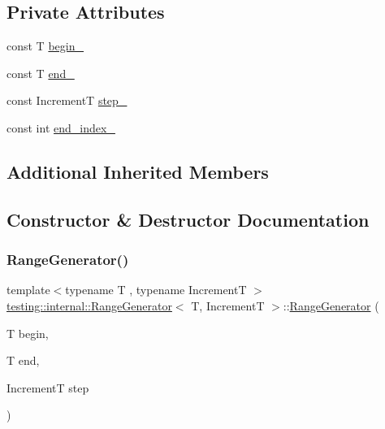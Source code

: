 \subsection*{Private Attributes}
\begin{DoxyCompactItemize}
\item 
const T \hyperlink{classtesting_1_1internal_1_1RangeGenerator_af16307fd21766bcbb973d8b3335f1a3f}{begin\+\_\+}
\item 
const T \hyperlink{classtesting_1_1internal_1_1RangeGenerator_ac36eecbaf80b51a59d59a4a4fdf5b5db}{end\+\_\+}
\item 
const IncrementT \hyperlink{classtesting_1_1internal_1_1RangeGenerator_ae7f3c4b76d8610f030fdd12285ebd8fb}{step\+\_\+}
\item 
const int \hyperlink{classtesting_1_1internal_1_1RangeGenerator_a336878a1871133e49665df60ea944076}{end\+\_\+index\+\_\+}
\end{DoxyCompactItemize}
\subsection*{Additional Inherited Members}


\subsection{Constructor \& Destructor Documentation}
\mbox{\label{classtesting_1_1internal_1_1RangeGenerator_a5b3b83223b9cada3569bcee729e0fdf3}} 
\subsubsection{\texorpdfstring{Range\+Generator()}{RangeGenerator()}}
{\footnotesize\ttfamily template$<$typename T , typename IncrementT $>$ \\
\hyperlink{classtesting_1_1internal_1_1RangeGenerator}{testing\+::internal\+::\+Range\+Generator}$<$ T, IncrementT $>$\+::\hyperlink{classtesting_1_1internal_1_1RangeGenerator}{Range\+Generator} (\begin{DoxyParamCaption}\item[{T}]{begin,  }\item[{T}]{end,  }\item[{IncrementT}]{step }\end{DoxyParamCaption})\hspace{0.3cm}{\ttfamily [inline]}}

